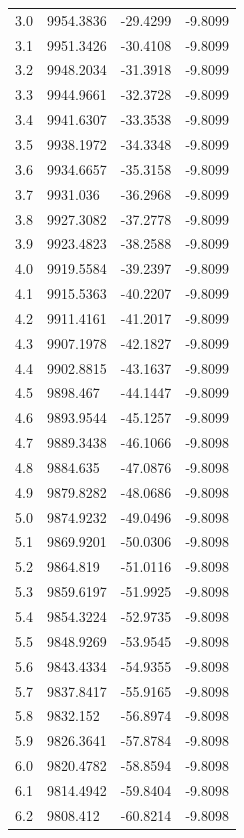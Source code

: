 \begin{table}[H]
\begin{tabular}{llll}
3.0 & 9954.3836 & -29.4299 & -9.8099 \\
3.1 & 9951.3426 & -30.4108 & -9.8099 \\
3.2 & 9948.2034 & -31.3918 & -9.8099 \\
3.3 & 9944.9661 & -32.3728 & -9.8099 \\
3.4 & 9941.6307 & -33.3538 & -9.8099 \\
3.5 & 9938.1972 & -34.3348 & -9.8099 \\
3.6 & 9934.6657 & -35.3158 & -9.8099 \\
3.7 & 9931.036 & -36.2968 & -9.8099 \\
3.8 & 9927.3082 & -37.2778 & -9.8099 \\
3.9 & 9923.4823 & -38.2588 & -9.8099 \\
4.0 & 9919.5584 & -39.2397 & -9.8099 \\
4.1 & 9915.5363 & -40.2207 & -9.8099 \\
4.2 & 9911.4161 & -41.2017 & -9.8099 \\
4.3 & 9907.1978 & -42.1827 & -9.8099 \\
4.4 & 9902.8815 & -43.1637 & -9.8099 \\
4.5 & 9898.467 & -44.1447 & -9.8099 \\
4.6 & 9893.9544 & -45.1257 & -9.8099 \\
4.7 & 9889.3438 & -46.1066 & -9.8098 \\
4.8 & 9884.635 & -47.0876 & -9.8098 \\
4.9 & 9879.8282 & -48.0686 & -9.8098 \\
5.0 & 9874.9232 & -49.0496 & -9.8098 \\
5.1 & 9869.9201 & -50.0306 & -9.8098 \\
5.2 & 9864.819 & -51.0116 & -9.8098 \\
5.3 & 9859.6197 & -51.9925 & -9.8098 \\
5.4 & 9854.3224 & -52.9735 & -9.8098 \\
5.5 & 9848.9269 & -53.9545 & -9.8098 \\
5.6 & 9843.4334 & -54.9355 & -9.8098 \\
5.7 & 9837.8417 & -55.9165 & -9.8098 \\
5.8 & 9832.152 & -56.8974 & -9.8098 \\
5.9 & 9826.3641 & -57.8784 & -9.8098 \\
6.0 & 9820.4782 & -58.8594 & -9.8098 \\
6.1 & 9814.4942 & -59.8404 & -9.8098 \\
6.2 & 9808.412 & -60.8214 & -9.8098 \\

\end{tabular}
\end{table}
